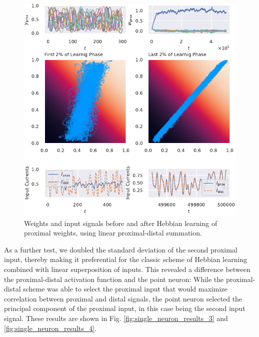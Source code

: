 \documentclass[10pt,a4paper,draft]{article}
\begin{document}
\begin{figure}
\centering
\includegraphics[width=\textwidth]{./figures/fig2.pdf}
\caption{Weights and input signals before and after Hebbian learning of proximal weights, using linear proximal-distal summation.}
\label{fig:single_neuron_results_2}
\end{figure}

As a further test, we doubled the standard deviation of the second proximal input, thereby making it preferential for the classic scheme of Hebbian learning combined with linear superposition of inputs. This revealed a difference between the proximal-distal activation function and the point neuron: While the proximal-distal scheme was able to select the proximal input that would maximize correlation between proximal and distal signals, the point neuron selected the principal component of the proximal input, in this case being the second input signal. These results are shown in Fig. \ref{fig:single_neuron_results_3} and \ref{fig:single_neuron_results_4}.
\end{document}

